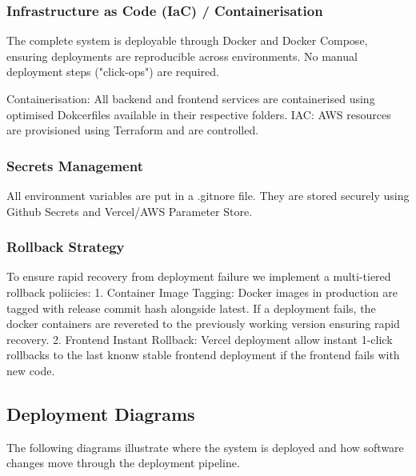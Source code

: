 \documentclass[12pt, a4paper]{article}
\begin{document}
\subsubsection{Infrastructure as Code (IaC) / Containerisation}

The complete system is deployable through Docker and Docker Compose, ensuring deployments are reproducible across environments. No manual deployment steps ("click-ops") are required.

Containerisation: All backend and frontend services are containerised using optimised Dokcerfiles available in their respective folders.
IAC: AWS resources are provisioned using Terraform and are controlled.

\subsubsection{Secrets Management}

All environment variables are put in a .gitnore file.
They are stored securely using Github Secrets and Vercel/AWS Parameter Store. 

\subsubsection{Rollback Strategy}

To ensure rapid recovery from deployment failure we implement a multi-tiered rollback poliicies: 
1. Container Image Tagging: Docker images in production are tagged with release commit hash alongside latest. If a deployment fails, the docker containers are revereted to the previously working version ensuring rapid recovery.
2. Frontend Instant Rollback: Vercel deployment allow instant 1-click rollbacks to the last knonw stable frontend deployment if the frontend fails with new code.

\subsection{Deployment Diagrams}

The following diagrams illustrate where the system is deployed and how software changes move through the deployment pipeline.
\end{document}
